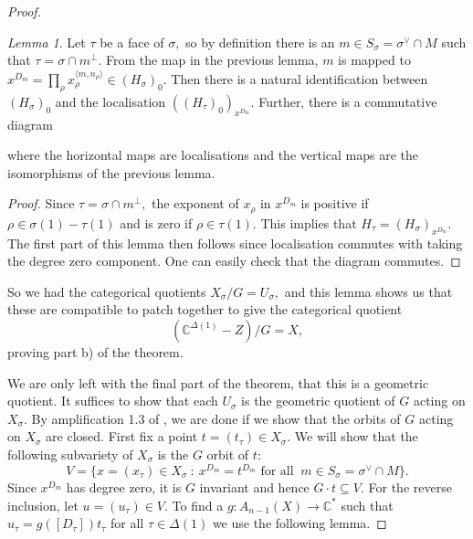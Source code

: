\documentclass[BSc]{usydthesis}
\numberwithin{equation}{chapter}
\theoremstyle{remark}
\newtheorem{Lemma}[equation]{Lemma}
\newcommand{\C}{\mathbb{C}}
\newcommand{\V}{\vee}
\begin{document}
\begin{proof}
  \begin{Lemma}
 Let $\tau$ be a face of $\sigma,$ so by definition there is an $m\in S_{\sigma} = \sigma^{\V}\cap M$ such that $\tau = \sigma \cap m^{\perp}.$ From the map in the previous lemma, $m$ is mapped to $x^{D_m} = \prod_{\rho} x_{\rho}^{ \langle m,n_{\rho} \rangle} \in (H_{\sigma})_0.$ Then there is a natural identification between $ (H_{\sigma})_0$ and the localisation $( (H_{\tau})_0 )_{x^{D_m}}.$ Further, there is a commutative diagram
 
\begin{center}
 \end{center}

where the horizontal maps are localisations and the vertical maps are the isomorphisms of the previous lemma.

  \end{Lemma}
 
 \begin{proof}
 Since $\tau = \sigma\cap m^{\perp},$ the exponent of $x_{\rho}$ in $x^{D_m}$ is positive if $\rho \in \sigma(1)-\tau(1)$ and is zero if $\rho\in \tau(1).$ This implies that $H_{\tau} = (H_{\sigma})_{x^{D_m}}.$ The first part of this lemma then follows since localisation commutes with taking the degree zero component. One can easily check that the diagram commutes.
 \end{proof}
 
So we had the categorical quotients $X_{\sigma}/G =U_{\sigma},$ and this lemma shows us that these are compatible to patch together to give the categorical quotient $$ (\C^{\Delta(1)} - Z)/G = X,$$ proving part b) of the theorem. 

We are only left with the final part of the theorem, that this is a geometric quotient. It suffices to show that each $U_{\sigma}$ is the geometric quotient of $G$ acting on $X_{\sigma}.$ By amplification 1.3 of \cite{GIT}, we are done if we show that the orbits of $G$ acting on $X_{\sigma}$ are closed. First fix a point $t=(t_{\tau})\in X_{\sigma}.$ We will show that the following subvariety of $X_{\sigma}$ is the $G$ orbit of $t:$ $$ V=\{ x=(x_{\tau})\in X_{\sigma} \ : \ x^{D_m} = t^{D_m} \text{ for all } \ m\in S_{\sigma} = \sigma^{\V}\cap M\}.$$ Since $x^{D_m}$ has degree zero, it is $G$ invariant and hence $G\cdot t \subseteq V.$ For the reverse inclusion, let $u=(u_{\tau})\in V.$ To find a $g:A_{n-1}(X)\to \C^*$ such that $u_{\tau} = g( [D_{\tau}]) t_{\tau}$ for all $\tau\in \Delta(1)$ we use the following lemma. 


\end{proof}
\end{document}
